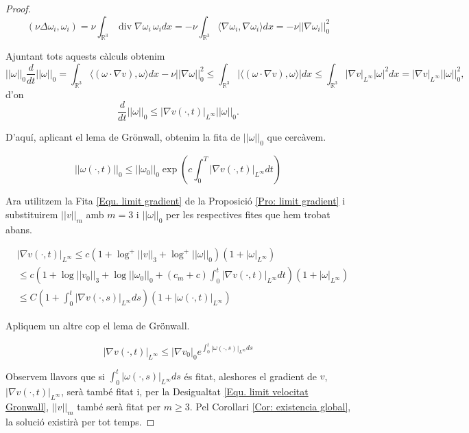 \documentclass{article}
\numberwithin{equation}{section}
\DeclareMathOperator{\diver}{div}
\begin{document}
\begin{proof}
\[(\nu\Delta\omega_i,\omega_i)=\nu\int_{\mathbb{R}^3}\diver\nabla\omega_i\,\omega_idx=-\nu\int_{\mathbb{R}^3}\langle\nabla\omega_i,\nabla\omega_i\rangle dx=-\nu||\nabla\omega_i||_0^2\]

Ajuntant tots aquests c\`{a}lculs obtenim
\[||\omega||_0\frac{d}{dt}||\omega||_0=\int_{\mathbb{R}^3}\langle(\omega\cdot\nabla v),\omega\rangle dx-\nu||\nabla\omega||_0^2\leq\int_{\mathbb{R}^3}|\langle(\omega\cdot\nabla v),\omega\rangle|dx\leq\int_{\mathbb{R}^3}|\nabla v|_{L^{\infty}}|\omega|^2dx=|\nabla v|_{L^{\infty}}||\omega||_0^2,\]
d'on
\[\frac{d}{dt}||\omega||_0\leq|\nabla v(\cdot,t)|_{L^{\infty}}||\omega||_0.\]

D'aqu\'{i}, aplicant el lema de Gr\"{o}nwall, obtenim la fita de $||\omega||_0$ que cerc\`{a}vem.

\[||\omega(\cdot,t)||_0\leq||\omega_0||_0\exp\left(c\int_0^T|\nabla v(\cdot,t)|_{L^{\infty}}dt\right)\]

Ara utilitzem la Fita \eqref{Equ. limit gradient} de la Proposici\'{o} \ref{Pro: limit gradient} i substituirem $||v||_m$ amb $m=3$ i $||\omega||_0$ per les respectives fites que hem trobat abans.

\begin{align*}
&|\nabla v(\cdot,t)|_{L^{\infty}}\leq c(1+\log^+||v||_3+\log^+||\omega||_0)(1+|\omega|_{L^{\infty}})\\
&\leq c\left(1+\log||v_0||_3+\log||\omega_0||_0+(c_m+c)\int_0^t|\nabla v(\cdot,t)|_{L^{\infty}}dt\right)(1+|\omega|_{L^{\infty}})\\
&\leq C\left(1+\int_0^t|\nabla v(\cdot,s)|_{L^{\infty}}ds\right)(1+|\omega(\cdot,t)|_{L^{\infty}})
\end{align*}

Apliquem un altre cop el lema de Gr\"{o}nwall.

\[|\nabla v(\cdot,t)|_{L^{\infty}}\leq|\nabla v_0|_0e^{\int_0^t|\omega(\cdot,s)|_{L^{\infty}}ds}\]

Observem llavors que si $\int_0^t|\omega(\cdot,s)|_{L^{\infty}}ds$ \'{e}s fitat, aleshores el gradient de $v$, $|\nabla v(\cdot,t)|_{L^{\infty}}$, ser\`{a} tamb\'{e} fitat i, per la Desigualtat \eqref{Equ. limit velocitat Gronwall}, $||v||_m$ tamb\'{e} ser\`{a} fitat per $m\geq3$. Pel Corol\textperiodcentered lari \ref{Cor: existencia global}, la soluci\'{o} existir\`{a} per tot temps.
\end{proof}
\end{document}
